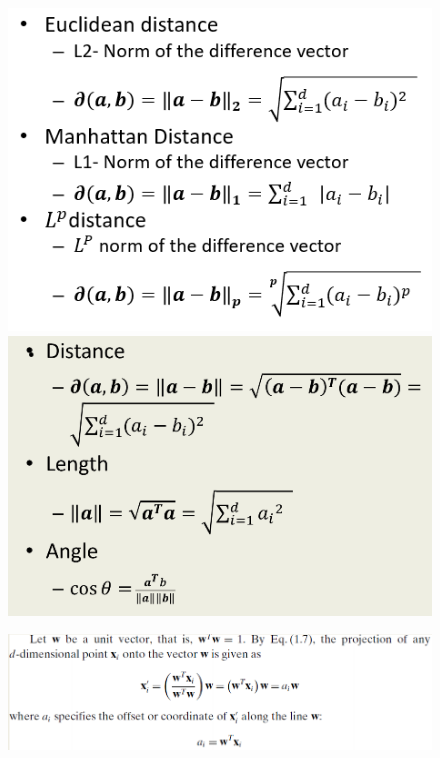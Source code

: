 \begin{figure}[H]
    \centering
    \begin{minipage}{0.5\textwidth}
        \centering
        \includegraphics[width=\textwidth]{Figures/dist.png} %
    \end{minipage}\hfill
    \begin{minipage}{0.5\textwidth}
        \centering
        \includegraphics[width=\textwidth]{Figures/misc.png} %
    \end{minipage}
\end{figure}
\begin{figure}[H]
\centerline{\includegraphics[width=\textwidth]{Figures/proj}}
\end{figure}

